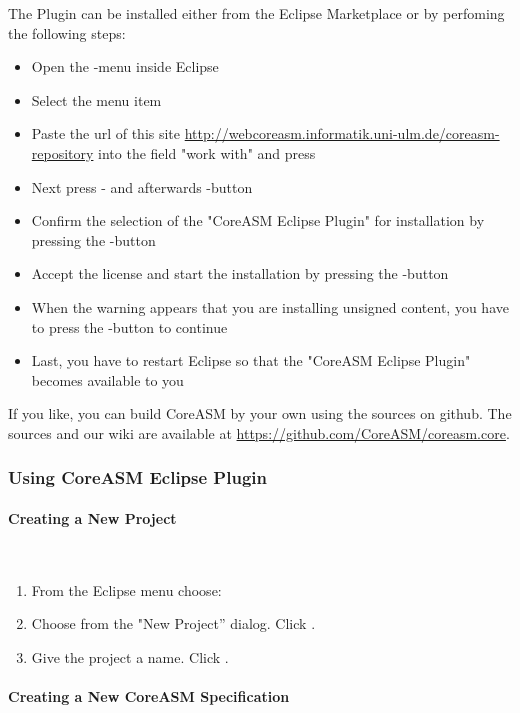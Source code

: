\documentclass{article}
\newcommand{\CoreASM}{{\sffamily CoreASM}\xspace}
\begin{document}
The Plugin can be installed either from the Eclipse Marketplace or by perfoming the following steps:

\begin{itemize}
\item Open the -menu inside Eclipse
\item Select the menu item 
\item Paste the url of this site \url{http://webcoreasm.informatik.uni-ulm.de/coreasm-repository} into the field "work with" and press 
\item Next press - and afterwards -button
\item Confirm the selection of the "CoreASM Eclipse Plugin" for installation by pressing the -button
\item Accept the license and start the installation by pressing the -button
\item When the warning appears that you are installing unsigned content, you have to press the -button to continue
\item Last, you have to restart Eclipse so that the "CoreASM Eclipse Plugin" becomes available to you
\end{itemize}

If you like, you can build CoreASM by your own using the sources on github. The sources and our wiki are available at \url{https://github.com/CoreASM/coreasm.core}.

\subsubsection{Using \CoreASM Eclipse Plugin}

\paragraph{Creating a New Project} ~

\begin{enumerate}
    \item From the Eclipse menu choose: 
    \item Choose  from the "New Project'' dialog. Click .
    \item Give the project a name. Click . 
\end{enumerate}

\paragraph{Creating a New \CoreASM Specification} ~
\end{document}
